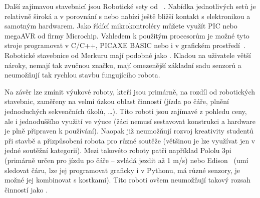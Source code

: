 
Další zajímavou stavebnicí jsou Robotické sety od ~\cite{merkur_roboticsSetsEshop}. 
Nabídka jednotlivých setů je relativně široká a v porovnání s \legoM{ }nebo \fischerT{ }nabízí ještě bližší kontakt s elektronikou a samotným hardwarem. 
Jako řídící mikrokontroléry můžete využít PIC nebo megaAVR od firmy Microchip. 
Vzhledem k použitým procesorům je možné tyto stroje programovat v C/C++, PICAXE BASIC nebo i v grafickém prostředí~\cite{picaxeCz_BlocklyForPICAXE}. 
Robotické stavebnice od Merkuru mají podobné  jako \fischerT. 
Kladou na uživatele větší nároky, nemají tak zvučnou značku, mají omezenější základní sadu senzorů a neumožňují tak rychlou stavbu fungujícího robota.

Na závěr lze zmínit výukové roboty, kteří jsou primárně, na rozdíl od robotických stavebnic, zaměřeny na velmi úzkou oblast činností (jízda po čáře, plnění jednoduchých sekvenčních úkolů, \dots). 
Tito roboti jsou zajímavé z pohledu ceny, ale i jednoduššího využití ve výuce (žáci nemusí sestavovat konstrukci a hardware je plně připraven k používání). 
Naopak již neumožňují rozvoj kreativity studentů při stavbě a přizpůsobení robota pro různé soutěže (většinou je lze využívat jen v jedné soutěžní kategorii).  
Mezi takovéto roboty patři například Pololu 3pi~\cite{robotPololu3pi} (primárně určen pro jízdu po čáře -- zvládá jezdit až 1 m/s) nebo Edison~\cite{robotEdison} (umí sledovat čáru, lze jej programovat graficky i v Pythonu, má různé senzory, je možné jej kombinovat s \lego{ }kostkami). 
Tito roboti ovšem neumožňují takový rozsah činností jako \legoM.

